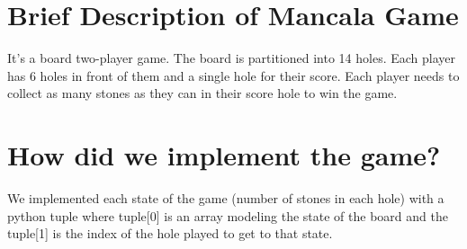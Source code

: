 \chapter{Brief Description of Mancala Game}
It’s a board two-player game. The board is partitioned into 14 holes. Each player has 6 holes in front of
them and a single hole for their score. Each player needs to collect as many stones as they
can in their score hole to win the game.

\chapter{How did we implement the game?}
We implemented each state of the game (number of stones in each hole) with a python tuple where tuple[0] is 
an array modeling the state of the board and the tuple[1] is the index of the hole played to get to
that state. 
\vskip 0.25in

